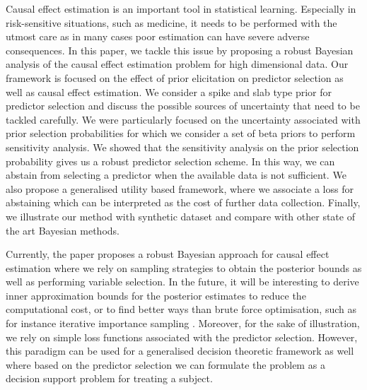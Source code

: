 \documentclass[preprint,12pt]{elsarticle}
\begin{document}
Causal effect estimation is an important tool in statistical learning.
Especially in risk-sensitive situations, such as medicine, it needs to
be performed with the utmost care as in many cases poor estimation can have severe adverse consequences.
In this paper, we tackle this issue by proposing a robust Bayesian analysis of the causal 
effect estimation problem for high dimensional data. Our 
framework is focused on the effect of prior elicitation on
predictor selection
as well as causal effect estimation. We consider a spike and slab type
prior for predictor selection and discuss the possible sources of uncertainty that
need to be tackled carefully. We were particularly focused on the uncertainty associated
with prior selection probabilities for which we consider a set of beta priors to perform
sensitivity analysis. We showed that the sensitivity analysis on the prior selection probability
gives us a robust predictor selection scheme. In this way, we can abstain from selecting
a predictor when the available data is not sufficient. We also propose a generalised
utility based framework, where we associate a loss for abstaining which can be interpreted 
as the cost of further data collection. Finally, we illustrate our method with synthetic dataset
and compare with other state of the art Bayesian methods. 


Currently, the paper proposes a robust Bayesian approach for causal effect estimation where
we rely on sampling strategies to obtain the posterior bounds as well as performing 
variable selection. In the future, it will be interesting to derive inner approximation bounds
for the posterior estimates to reduce the computational cost,
or to find better ways than brute force optimisation, such as for instance iterative importance sampling \citep{cruz22_importance}. Moreover, for the sake of
illustration, we rely on simple loss functions
associated with the predictor selection. However,
this paradigm can be used for a generalised
decision theoretic framework as well where based on
the predictor selection we can formulate the 
problem as a decision support problem for treating a subject.
\end{document}
